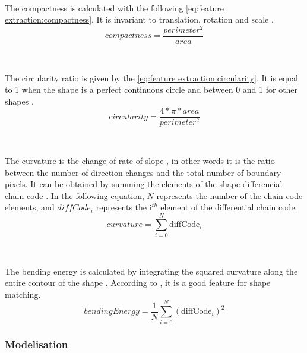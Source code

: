 ~~

The compactness is calculated with the following \vref{eq:feature extraction:compactness}. It is invariant to translation, rotation and scale  \cite{bib:chain:RepresentationAndDescription}.
\begin{equation} \label{eq:feature extraction:compactness}
compactness = \frac{perimeter^2}{area}
\end{equation}

~~

The circularity ratio is given by the \vref{eq:feature extraction:circularity}. It is equal to 1 when the shape is a perfect continuous circle and between 0 and 1 for other shapes \cite{bib:chain:ObjectDescription}.
\begin{equation} \label{eq:feature extraction:circularity}
circularity = \frac{4 * \pi * area}{perimeter^2}
\end{equation}

~~ 

The curvature is the change of rate of slope \cite{bib:chain:ObjectDescription}, in other words it is the ratio between the number of direction changes and the total number of boundary pixels. It can be obtained by summing the elements of the shape differencial chain code  \cite{bib:chain:ShapeRepresentationDescription}. In the following equation, $N$ represents the number of the chain code elements, and $diffCode_i$ represents the i$^{th}$ element of the differential chain code. 
\begin{equation}
curvature = \sum_{i = 0}^{N} \text{diffCode}_i
\end{equation}


~~

The bending energy is calculated by integrating the squared curvature along the entire contour of the shape \cite{bib:chain:ShapeRepresentationDescription}. According to \cite{bib:chain:ShapeDescriptionLesson}, it is a good feature for shape matching. 
\begin{equation}
bendingEnergy = \frac{1}{N} \sum_{i = 0}^{N} (\text{diffCode}_i)^{2}
\end{equation}


\subsubsection{Modelisation}










